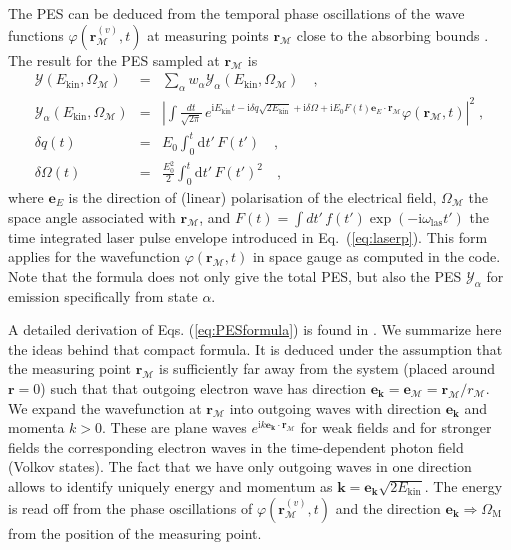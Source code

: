 \documentclass[final,1p]{elsarticle}
\begin{document}
The PES can be deduced from the temporal phase oscillations of the
wave functions $\varphi(\mathbf{r}^{(v)}_\mathcal{M},t)$ at measuring
points $\mathbf{r}_\mathcal{M}$ close to the absorbing bounds
\cite{Poh00}.  The result for the PES sampled at
$\mathbf{r}_\mathcal{M}$ is
\begin{subequations}
\label{eq:PESformula}
\begin{eqnarray}
  \mathcal{Y}(E_\mathrm{kin},\Omega_\mathcal{M})
  &=&
  \sum_\alpha w_\alpha
  \mathcal{Y}_\alpha(E_\mathrm{kin},\Omega_\mathcal{M})
  \quad,
\\
  \mathcal{Y}_\alpha(E_\mathrm{kin},\Omega_\mathcal{M})
  &=&
  \left|
  \!\int\!\frac{dt}{\sqrt{2\pi}}\,e^{\mathrm{i}E_\mathrm{kin}t
              -\mathrm{i}\delta q\sqrt{2E_\mathrm{kin}}
              +\mathrm{i}\delta\Omega
              +\mathrm{i}E_0F(t)\mathbf{e}_E\cdot\mathbf{r}_\mathcal{M}}
               \varphi(\mathbf{r}_\mathcal{M},t)
  \right|^2
  \;,
\label{eq:solve-wf}
\\
  \delta q(t)
  &=&
  E_0 \int_{0}^t\mathrm dt'\,F(t')
  \quad,
\label{eq:delq}\\
  \delta\Omega(t)
  &=&
  \frac{E_0^2}{2}\int_{0}^t\mathrm dt'\,F(t')^2
  \quad,
\label{eq:delOmega}
\end{eqnarray}
\end{subequations}
where $\mathbf{e}_E$ is the direction of (linear) polarisation of the
electrical field, $\Omega_\mathcal{M}$ the space angle associated with
$\mathbf{r}_\mathcal{M}$, and
$F(t)=\int{d}t'\,f(t')\exp{(-\mathrm{i}\omega_\mathrm{las}t')}$ the
time integrated laser pulse envelope introduced in
Eq.~(\ref{eq:laserp}).  This form applies for the wavefunction
$\varphi(\mathbf{r}_\mathcal{M},t)$ in space gauge as computed in the
code. Note that the formula does not only give the total PES, but also
the PES $\mathcal{Y}_\alpha$ for emission specifically from state
$\alpha$.

A detailed derivation of Eqs. (\ref{eq:PESformula}) is found in
\cite{Din13a}.  We summarize here the ideas behind that compact
formula.  It is deduced under the assumption that the measuring point
$\mathbf{r}_\mathcal{M}$ is sufficiently far away from the system
(placed around $\mathbf{r}=0$) such that that outgoing electron wave
has direction
$\mathbf{e}_{\mathbf{k}}=\mathbf{e}_\mathcal{M}=\mathbf{r}_\mathcal{M}/r_\mathcal{M}$.
We expand the wavefunction at $\mathbf{r}_\mathcal{M}$ into outgoing
waves with direction $\mathbf{e}_{\mathbf{k}}$ and momenta
$k>0$. These are plane waves
$e^{\mathrm{i}k\mathbf{e}_{\mathbf{k}}\cdot\mathbf{r}_\mathcal{M}}$
for weak fields and for stronger fields the corresponding electron
waves in the time-dependent photon field (Volkov states).  The fact
that we have only outgoing waves in one direction allows to identify
uniquely energy and momentum as
$\mathbf{k}=\mathbf{e}_{\mathbf{k}}\sqrt{2E_\mathrm{kin}}$.  The
energy is read off from the phase oscillations of
$\varphi(\mathbf{r}^{(v)}_\mathcal{M},t)$ and the direction
$\mathbf{e}_{\mathbf{k}}\Rightarrow\Omega_\mathrm{M}$ from the
position of the measuring point.
\end{document}
